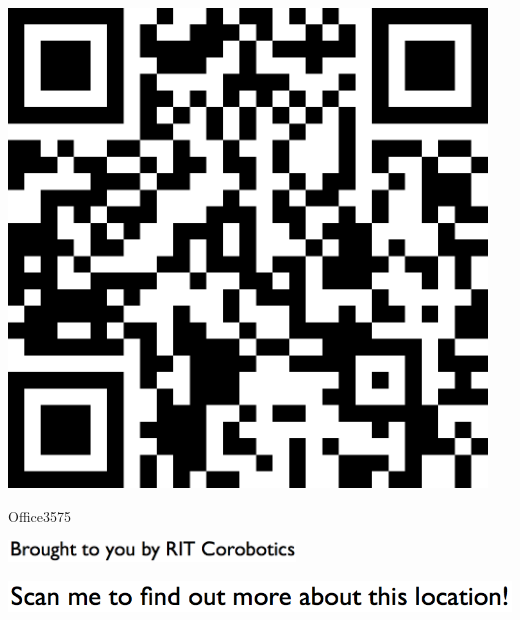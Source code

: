 \documentclass[letterpaper]{article}
\begin{document}
 \begingroup 
 \centerline{\includegraphics[scale=1,width=5in,height=5in]{Office3575.png}} 
 \endgroup 
 \vspace*{\fill} 

 \hfill{\small Office3575} 

  \vspace{0.7in} 
 
 \centerline{\includegraphics[scale=1,width=3in]{text-bottom.png}} 
 
 \pagebreak 
{} 
 \vspace*{\fill} 
 
  \centerline{\includegraphics[scale=1,width=6in]{text-top.png}} 
 
 \vspace{0.5in} 
 
\end{document}
